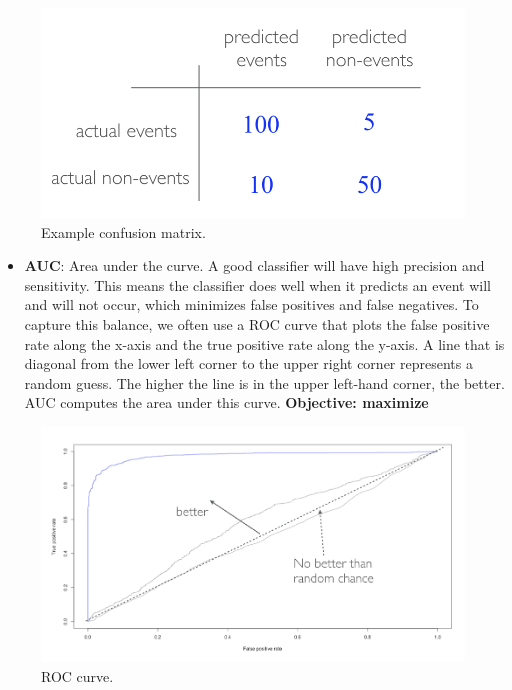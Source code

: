 \documentclass[]{book}
\providecommand{\tightlist}{%
  \setlength{\itemsep}{0pt}\setlength{\parskip}{0pt}}
\theoremstyle{definition}
\theoremstyle{definition}
\theoremstyle{definition}
\theoremstyle{remark}
\begin{document}
\begin{figure}

{\centering \includegraphics[width=0.5\linewidth,height=0.5\textheight]{illustrations/confusion-matrix2} 

}

\caption{Example confusion matrix.}\label{fig:confusion-matrix2}
\end{figure}

\begin{itemize}
\tightlist
\item
  \textbf{AUC}: Area under the curve. A good classifier will have high
  precision and sensitivity. This means the classifier does well when it
  predicts an event will and will not occur, which minimizes false
  positives and false negatives. To capture this balance, we often use a
  ROC curve that plots the false positive rate along the x-axis and the
  true positive rate along the y-axis. A line that is diagonal from the
  lower left corner to the upper right corner represents a random guess.
  The higher the line is in the upper left-hand corner, the better. AUC
  computes the area under this curve. \textbf{Objective: maximize}
\end{itemize}

\begin{figure}

{\centering \includegraphics[width=0.75\linewidth,height=0.75\textheight]{illustrations/roc} 

}

\caption{ROC curve.}\label{fig:roc}
\end{figure}
\end{document}
